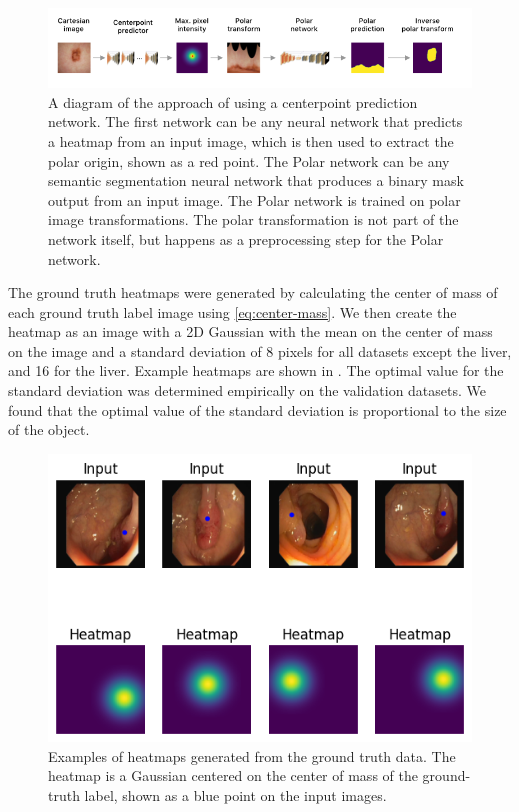 	\begin{figure}[h]
		\centering
		\includegraphics[width=\linewidth]{images/4/centerpoint-approach}
		\caption{A diagram of the approach of using a centerpoint prediction network. The first network can be any neural network that predicts a heatmap from an input image, which is then used to extract the polar origin, shown as a red point. The Polar network can be any semantic segmentation neural network that produces a binary mask output from an input image. The Polar network is trained on polar image transformations. The polar transformation is not part of the network itself, but happens as a preprocessing step for the Polar network. \cite{bencevicTrainingPolarImage2021}}
		\label{fig:centerpoint-approach}
	\end{figure}
 
The ground truth heatmaps were generated by calculating the center of mass of each ground truth label 
image using \eqref{eq:center-mass}. We then create the heatmap as an image with a 2D Gaussian with the
mean on 
the center of mass on the image and a standard deviation of 8 pixels for all datasets except the liver, and 16 for the liver.
Example heatmaps are shown in 
. The optimal value for the standard deviation was determined empirically on the 
validation datasets. We found that the optimal value of the standard deviation is proportional to the size 
of the object.

	\begin{figure}[h]
		\centering
		\includegraphics[width=0.8\linewidth]{images/4/heatmaps}
		\caption{Examples of heatmaps generated from the ground truth data. The heatmap is a Gaussian centered on the center of mass of the ground-truth label, shown as a blue point on the input images. \cite{bencevicTrainingPolarImage2021}}
		\label{fig:heatmap}
	\end{figure}
	
